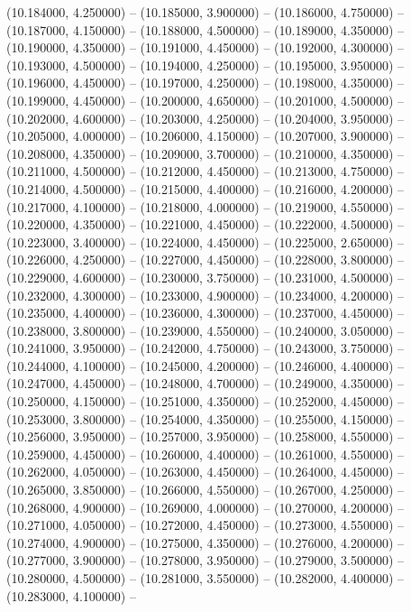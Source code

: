 (10.184000, 4.250000) -- 
(10.185000, 3.900000) -- 
(10.186000, 4.750000) -- 
(10.187000, 4.150000) -- 
(10.188000, 4.500000) -- 
(10.189000, 4.350000) -- 
(10.190000, 4.350000) -- 
(10.191000, 4.450000) -- 
(10.192000, 4.300000) -- 
(10.193000, 4.500000) -- 
(10.194000, 4.250000) -- 
(10.195000, 3.950000) -- 
(10.196000, 4.450000) -- 
(10.197000, 4.250000) -- 
(10.198000, 4.350000) -- 
(10.199000, 4.450000) -- 
(10.200000, 4.650000) -- 
(10.201000, 4.500000) -- 
(10.202000, 4.600000) -- 
(10.203000, 4.250000) -- 
(10.204000, 3.950000) -- 
(10.205000, 4.000000) -- 
(10.206000, 4.150000) -- 
(10.207000, 3.900000) -- 
(10.208000, 4.350000) -- 
(10.209000, 3.700000) -- 
(10.210000, 4.350000) -- 
(10.211000, 4.500000) -- 
(10.212000, 4.450000) -- 
(10.213000, 4.750000) -- 
(10.214000, 4.500000) -- 
(10.215000, 4.400000) -- 
(10.216000, 4.200000) -- 
(10.217000, 4.100000) -- 
(10.218000, 4.000000) -- 
(10.219000, 4.550000) -- 
(10.220000, 4.350000) -- 
(10.221000, 4.450000) -- 
(10.222000, 4.500000) -- 
(10.223000, 3.400000) -- 
(10.224000, 4.450000) -- 
(10.225000, 2.650000) -- 
(10.226000, 4.250000) -- 
(10.227000, 4.450000) -- 
(10.228000, 3.800000) -- 
(10.229000, 4.600000) -- 
(10.230000, 3.750000) -- 
(10.231000, 4.500000) -- 
(10.232000, 4.300000) -- 
(10.233000, 4.900000) -- 
(10.234000, 4.200000) -- 
(10.235000, 4.400000) -- 
(10.236000, 4.300000) -- 
(10.237000, 4.450000) -- 
(10.238000, 3.800000) -- 
(10.239000, 4.550000) -- 
(10.240000, 3.050000) -- 
(10.241000, 3.950000) -- 
(10.242000, 4.750000) -- 
(10.243000, 3.750000) -- 
(10.244000, 4.100000) -- 
(10.245000, 4.200000) -- 
(10.246000, 4.400000) -- 
(10.247000, 4.450000) -- 
(10.248000, 4.700000) -- 
(10.249000, 4.350000) -- 
(10.250000, 4.150000) -- 
(10.251000, 4.350000) -- 
(10.252000, 4.450000) -- 
(10.253000, 3.800000) -- 
(10.254000, 4.350000) -- 
(10.255000, 4.150000) -- 
(10.256000, 3.950000) -- 
(10.257000, 3.950000) -- 
(10.258000, 4.550000) -- 
(10.259000, 4.450000) -- 
(10.260000, 4.400000) -- 
(10.261000, 4.550000) -- 
(10.262000, 4.050000) -- 
(10.263000, 4.450000) -- 
(10.264000, 4.450000) -- 
(10.265000, 3.850000) -- 
(10.266000, 4.550000) -- 
(10.267000, 4.250000) -- 
(10.268000, 4.900000) -- 
(10.269000, 4.000000) -- 
(10.270000, 4.200000) -- 
(10.271000, 4.050000) -- 
(10.272000, 4.450000) -- 
(10.273000, 4.550000) -- 
(10.274000, 4.900000) -- 
(10.275000, 4.350000) -- 
(10.276000, 4.200000) -- 
(10.277000, 3.900000) -- 
(10.278000, 3.950000) -- 
(10.279000, 3.500000) -- 
(10.280000, 4.500000) -- 
(10.281000, 3.550000) -- 
(10.282000, 4.400000) -- 
(10.283000, 4.100000) -- 
